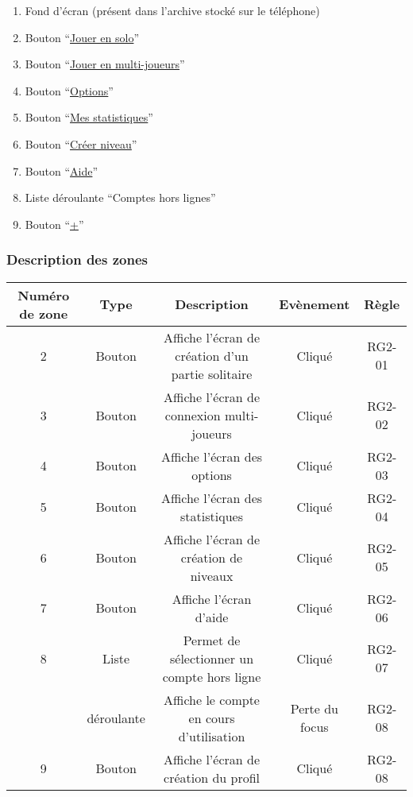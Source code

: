 \documentclass{report}
\begin{document}
		\begin{enumerate}
		  \item Fond d'écran (présent dans l'archive stocké sur le téléphone)
		  \item Bouton ``\hyperlink{Creer partie solo}{Jouer en solo}''
		  \item Bouton ``\hyperlink{Connexion multi-joueurs}{Jouer en multi-joueurs}''
		  \item Bouton ``\hyperlink{Options}{Options}''
		  \item Bouton ``\hyperlink{Statistiques}{Mes statistiques}''
		  \item Bouton ``\hyperlink{Creer niveau}{Créer niveau}''
		  \item Bouton ``\hyperlink{Aide}{Aide}''
		  \item Liste déroulante ``Comptes hors lignes''
		  \item Bouton ``\hyperlink{profil}{+}''
		\end{enumerate}

		\subsubsection{Description des zones}
		
		\begin{tabular}{|c|c|c|c|c|} \hline
			Numéro de zone & Type  & Description & Evènement &	Règle \\\hline 
			2 & Bouton & Affiche l'écran de création d'un partie solitaire & Cliqué & RG2-01 \\\hline
			3 & Bouton & Affiche l'écran de connexion multi-joueurs & Cliqué & RG2-02 \\\hline
			4 & Bouton & Affiche l'écran des options & Cliqué & RG2-03 \\\hline
			5 & Bouton & Affiche l'écran des statistiques & Cliqué & RG2-04 \\\hline
			6 & Bouton & Affiche l'écran de création de niveaux & Cliqué & RG2-05 \\\hline
			7 & Bouton & Affiche l'écran d'aide & Cliqué & RG2-06 \\\hline
			8 & Liste & Permet de sélectionner un compte hors ligne & Cliqué & RG2-07 \\ 
			  & déroulante & Affiche le compte en cours d'utilisation & Perte du focus & RG2-08\\\hline
			9 & Bouton & Affiche l'écran de création du profil & Cliqué & RG2-08 \\\hline
			
		\end{tabular}
		
\end{document}
